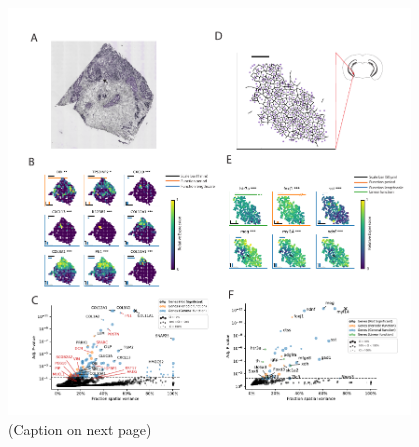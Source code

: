 \begin{figure}[b!]
    \centering
    \includegraphics[width=0.95\textwidth]{"Figure 2"}
    \caption[Applications of  to Spatial Transcriptomics and data generated using SeqFISH]{(Caption on next page)}
    \label{fig:spatialresult}
\end{figure}
\addtocounter{figure}{-1}
